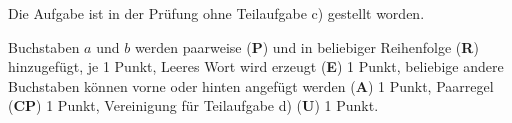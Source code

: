 \begin{diskussion}
Die Aufgabe ist in der Prüfung ohne Teilaufgabe c) gestellt worden.
\end{diskussion}

\begin{bewertung}
Buchstaben $a$ und $b$ werden paarweise ({\bf P}) und in beliebiger
Reihenfolge ({\bf R}) hinzugefügt, je 1 Punkt,
Leeres Wort wird erzeugt ({\bf E}) 1 Punkt,
beliebige andere Buchstaben können vorne oder hinten angefügt werden
({\bf A}) 1 Punkt,
Paarregel ({\bf CP}) 1 Punkt,
Vereinigung für Teilaufgabe d) ({\bf U}) 1 Punkt.
\end{bewertung}



